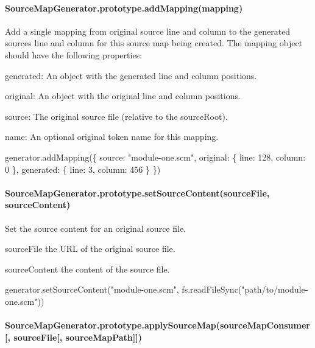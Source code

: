 \paragraph*{Source\+Map\+Generator.\+prototype.\+add\+Mapping(mapping)}

Add a single mapping from original source line and column to the generated source\textquotesingle{}s line and column for this source map being created. The mapping object should have the following properties\+:


\begin{DoxyItemize}
\item {\ttfamily generated}\+: An object with the generated line and column positions.
\item {\ttfamily original}\+: An object with the original line and column positions.
\item {\ttfamily source}\+: The original source file (relative to the source\+Root).
\item {\ttfamily name}\+: An optional original token name for this mapping.
\end{DoxyItemize}


\begin{DoxyCode}
generator.addMapping(\{
  source: "module-one.scm",
  original: \{ line: 128, column: 0 \},
  generated: \{ line: 3, column: 456 \}
\})
\end{DoxyCode}


\paragraph*{Source\+Map\+Generator.\+prototype.\+set\+Source\+Content(source\+File, source\+Content)}

Set the source content for an original source file.


\begin{DoxyItemize}
\item {\ttfamily source\+File} the U\+RL of the original source file.
\item {\ttfamily source\+Content} the content of the source file.
\end{DoxyItemize}


\begin{DoxyCode}
generator.setSourceContent("module-one.scm",
                           fs.readFileSync("path/to/module-one.scm"))
\end{DoxyCode}


\paragraph*{Source\+Map\+Generator.\+prototype.\+apply\+Source\+Map(source\+Map\+Consumer\mbox{[}, source\+File\mbox{[}, source\+Map\+Path\mbox{]}\mbox{]})}

